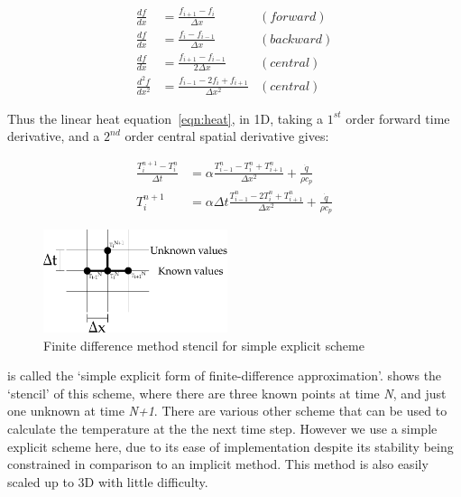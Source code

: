 \begin{subequations}
\begin{align}
\frac{df}{dx} &= \frac{f_{i+1} - f_{i}}{\Delta x}  &(forward) \label{eqn:fdmfwd}\\
\frac{df}{dx} &= \frac{f_{i} - f_{i-1}}{\Delta x}  &(backward) \label{eqn:fdmbck}\\
\frac{df}{dx} &= \frac{f_{i+1} - f_{i-1}}{2\Delta x}  &(central)\label{eqn:fdmcent}\\
\frac{d^2f}{dx^2} &= \frac{f_{i-1}-2f_i+f_{i+1}}{\Delta x^2} &(central)\label{eqn:fdmcent2}
\end{align}
\end{subequations}


Thus the linear heat equation~\cref{eqn:heat}, in 1D, taking a $1^{st}$ order forward time derivative, and a $2^{nd}$ order central spatial derivative gives:

\begin{subequations}
\begin{align}
\frac{T^{n+1}_i-T^{n}_i}{\Delta t} &= \alpha\frac{T^n_{i-1}-T^n_{i}+T^n_{i+1}}{\Delta x^2}  + \frac{\dot{q}}{\rho c_p}\\
T_{i}^{n+1} &=  \alpha\Delta t \frac{T_{i-1}^n-2T_i^n+T_{i+1}^n}{\Delta x^2} + \frac{\dot{q}}{\rho c_p}
\label{eqn:simplefdm}
\end{align}
\end{subequations}

\begin{figure}
  \begin{center}
    \includegraphics[width=0.48\textwidth]{./ablation/images/fdm-stencil.pdf}
  \end{center}
  \caption{Finite difference method stencil for simple explicit scheme}\label{fig:fdmstencil}
\end{figure}

 is called the `simple explicit form of finite-difference approximation'\cite{ozisik1994finite}.  shows the `stencil' of this scheme, where there are three known points at time \textit{N}, and just one unknown at time \textit{N+1}. There are various other scheme that can be used to calculate the temperature at the the next time step. However we use a simple explicit scheme here, due to its ease of implementation despite its stability being constrained in comparison to an implicit method. This method is also easily scaled up to 3D with little difficulty.

